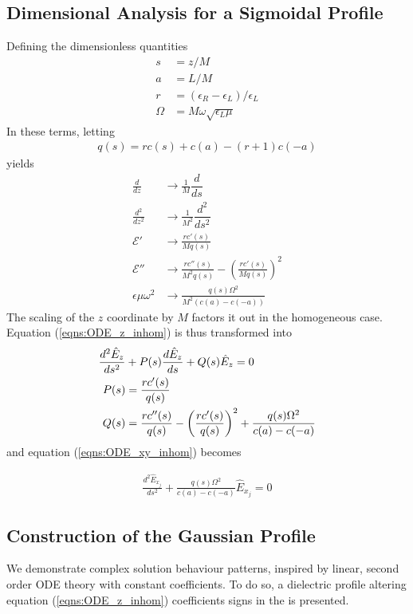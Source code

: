 \documentclass[twocolumn,secnumarabic,amssymb, nobibnotes, aps, prd]{revtex4-1}
\begin{document}
\subsection{Dimensional Analysis for a Sigmoidal Profile}
Defining the dimensionless quantities 
\begin{subequations}
\begin{align}
s &= z/M \label{eqns:def_nd_sigmoid_s} \\
a &= L/M \label{eqns:def_nd_sigmoid_a} \\
r &= (\epsilon_R - \epsilon_L)/\epsilon_L \label{eqns:def_nd_sigmoid_r} \\
\Omega &= M \omega \sqrt{\epsilon_L \mu} \label{eqns:def_nd_sigmoid_W} 
\end{align}
\end{subequations}
In these terms, letting
\begin{align}
q(s) = rc(s)+c(a)-(r+1)c(-a)
\label{eqns:eps_simp}
\end{align}
yields
\begin{align*}
\frac{d}{dz} &\rightarrow \frac{1}{M}\dfrac{d}{ds} \\
\frac{d^2}{dz^2} &\rightarrow \frac{1}{M^2}\dfrac{d^2}{ds^2} \\
\mathcal{E}' &\rightarrow \frac{r c'(s)}{M q(s)}	\\
\mathcal{E}'' &\rightarrow \frac{r c''(s)}{M^2 q(s)} - \left( \frac{r c'(s)}{M q(s)}\right)^2 \\
\epsilon \mu \omega^2 &\rightarrow \frac{q(s) \Omega ^2}{M^2 (c(a)-c(-a))}
\end{align*}
The scaling of the $z$ coordinate by $M$ factors it out in the  homogeneous case. Equation (\ref{eqns:ODE_z_inhom}) is thus transformed into 
\begin{align}
\label{eqns:ODE_Ez_DimGroup}
\frac{d^2 \hat{E}_z}{ds^2} & + P(s) \frac{d \hat{E}_z}{ds} + Q(s) \hat{E}_z = 0 \\
P(s) &= \frac{r c'(s)}{q(s)} \notag \\
Q(s) &=   \frac{r c''(s)}{q(s)} - \left( \frac{r c'(s)}{ q(s)}\right)^2 + \frac{q(s) \Omega ^2}{c(a)-c(-a)}   \notag
\end{align}
and equation (\ref{eqns:ODE_xy_inhom}) becomes

\begin{align}
\label{eqns:ODE_Ex_DimGroup}
\frac{d^2 \hat{E}_{x_j}}{ds^2} + \frac{q(s) \Omega ^2}{c(a)-c(-a)}\hat{E}_{x_j} = 0
\end{align}


\subsection{Construction of the Gaussian Profile}We demonstrate complex solution behaviour patterns, inspired by linear, second order ODE theory with constant coefficients. To do so, a dielectric profile altering equation (\ref{eqns:ODE_z_inhom}) coefficients signs in the is presented. \\
\end{document}
